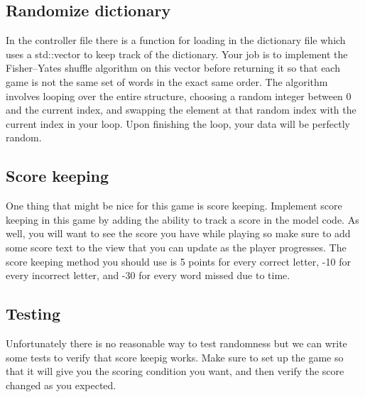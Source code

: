 \documentclass{tufte-handout}
\begin{document}
\subsection{Randomize dictionary}

In the controller file there is a function for loading in the dictionary file which
uses a std::vector to keep track of the dictionary. Your job is to implement the
Fisher–Yates shuffle algorithm on this vector before returning it so that each game
is not the same set of words in the exact same order. The algorithm involves looping
over the entire structure, choosing a random integer between 0 and the current index,
and swapping the element at that random index with the current index in your loop.
Upon finishing the loop, your data will be perfectly random.

\subsection{Score keeping}

One thing that might be nice for this game is score keeping. Implement score keeping
in this game by adding the ability to track a score in the model code. As well, you
will want to see the score you have while playing so make sure to add some score text
to the view that you can update as the player progresses. The score keeping method you
should use is 5 points for every correct letter, -10 for every incorrect letter, and
-30 for every word missed due to time.

\subsection{Testing}

Unfortunately there is no reasonable way to test randomness but we can write some
tests to verify that score keepig works. Make sure to set up the game so that it will
give you the scoring condition you want, and then verify the score changed as you expected.
\end{document}

